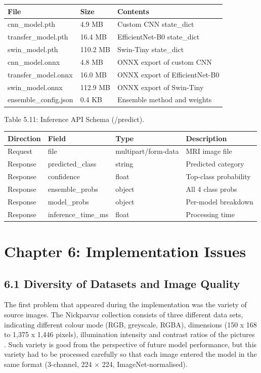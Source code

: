 \documentclass[12pt,a4paper,oneside]{report}
\begin{document}
\begin{center}
\small
\begin{tabularx}{\textwidth}{YYY}
\toprule
\textbf{File} & \textbf{Size} & \textbf{Contents} \\
\midrule
cnn\_model.pth & 4.9 MB & Custom CNN state\_dict \\
transfer\_model.pth & 16.4 MB & EfficientNet-B0 state\_dict \\
swin\_model.pth & 110.2 MB & Swin-Tiny state\_dict \\
cnn\_model.onnx & 4.8 MB & ONNX export of custom CNN \\
transfer\_model.onnx & 16.0 MB & ONNX export of EfficientNet-B0 \\
swin\_model.onnx & 112.9 MB & ONNX export of Swin-Tiny \\
ensemble\_config.json & 0.4 KB & Ensemble method and weights \\
\bottomrule
\end{tabularx}
\end{center}
Table 5.11: Inference API Schema (/predict).
\begin{center}
\small
\begin{tabularx}{\textwidth}{YYYY}
\toprule
\textbf{Direction} & \textbf{Field} & \textbf{Type} & \textbf{Description} \\
\midrule
Request & file & multipart/form-data & MRI image file \\
Response & predicted\_class & string & Predicted category \\
Response & confidence & float & Top-class probability \\
Response & ensemble\_probs & object & All 4 class probs \\
Response & model\_probs & object & Per-model breakdown \\
Response & inference\_time\_ms & float & Processing time \\
\bottomrule
\end{tabularx}
\end{center}
\chapter*{Chapter 6: Implementation Issues}
\section*{6.1 Diversity of Datasets and Image Quality}
The first problem that appeared during the implementation was the variety of source images. The Nickparvar collection consists of three different data sets, indicating different colour mode (RGB, greyscale, RGBA), dimensions (150 x 168 to 1,375 x 1,446 pixels), illumination intensity and contrast ratios of the pictures . Such variety is good from the perspective of future model performance, but this variety had to be processed carefully so that each image entered the model in the same format (3-channel, 224 × 224, ImageNet-normalised).
\end{document}
